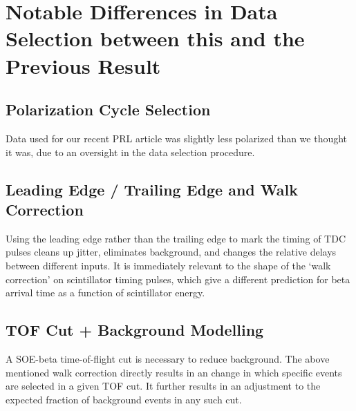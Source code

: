 


\clearpage	
\chapter{Notable Differences in Data Selection between this and the Previous Result}
\section{Polarization Cycle Selection}
	Data used for our recent PRL article was slightly less polarized than we thought it was, due to an oversight in the data selection procedure.
	
\section{Leading Edge / Trailing Edge and Walk Correction}
	Using the leading edge rather than the trailing edge to mark the timing of TDC pulses cleans up jitter, eliminates background, and changes the relative delays between different inputs.  It is immediately relevant to the shape of the `walk correction' on scintillator timing pulses, which give a different prediction for beta arrival time as a function of scintillator energy.  %
	
\section{TOF Cut + Background Modelling}
	A SOE-beta time-of-flight cut is necessary to reduce background.  The above mentioned walk correction directly results in an change in which specific events are selected in a given TOF cut.  It further results in an adjustment to the expected fraction of background events in any such cut.
	
